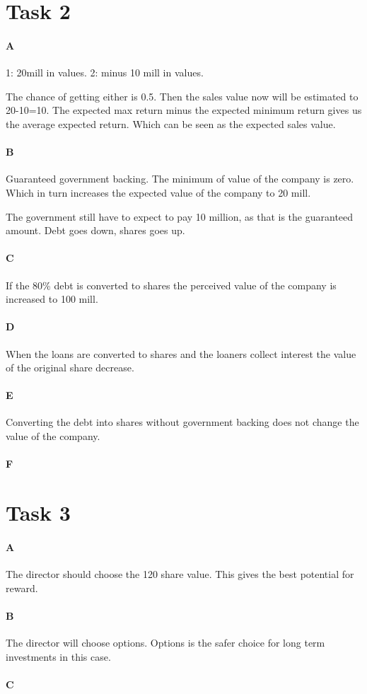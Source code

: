 \documentclass[12pt, a4paper]{article}
\begin{document}
\section{Task 2}
\paragraph{A}
1: 20mill in values. 2: minus 10 mill in values. 

The chance of getting either is 0.5. Then the sales value now will be estimated
to 20-10=10. The expected max return minus the expected minimum return gives us
the average expected return. Which can be seen as the expected sales value. 

\paragraph{B}
Guaranteed government backing. The minimum of value of the company is zero.
Which in turn increases the expected value of the company to 20 mill. 

The government still have to expect to pay 10 million, as that is the
guaranteed amount. Debt goes down, shares goes up. 

\paragraph{C}
If the 80\% debt is converted to shares the perceived value of the company is
increased to 100 mill. 

\paragraph{D}
When the loans are converted to shares and the loaners collect interest the
value of the original share decrease. 

\paragraph{E}
Converting the debt into shares without government backing does not change the
value of the company.

\paragraph{F}

\section{Task 3}
\paragraph{A}
The director should choose the 120 share value. This gives the best potential
for reward. 

\paragraph{B}
The director will choose options. Options is the safer choice for long term
investments in this case. 

\paragraph{C}
\end{document}

